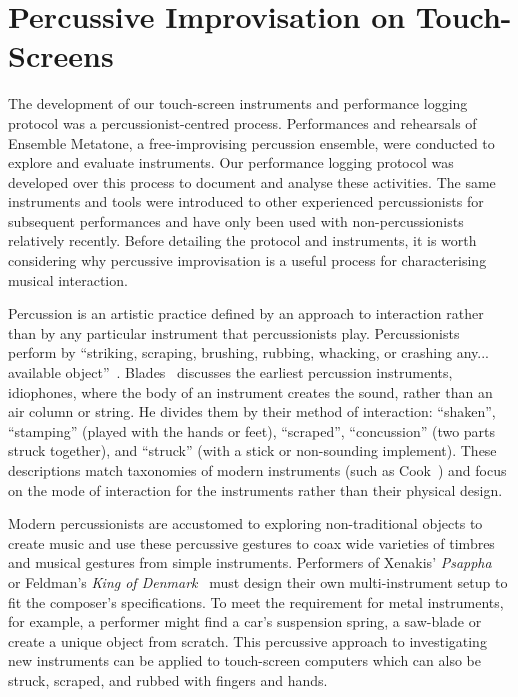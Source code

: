 \documentclass[graybox]{svmult}
\begin{document}
\section{Percussive Improvisation on Touch-Screens}
\label{sec:percussive-interaction}

The development of our touch-screen instruments and performance
logging protocol was a percussionist-centred process. Performances and
rehearsals of Ensemble Metatone, a free-improvising percussion
ensemble, were conducted to explore and evaluate instruments. Our
performance logging protocol was developed over this process to
document and analyse these activities. The same instruments and tools
were introduced to other experienced percussionists for subsequent
performances and have only been used with non-percussionists
relatively recently. Before detailing the protocol and instruments, it
is worth considering why percussive improvisation is a useful process
for characterising musical interaction.

Percussion is an artistic practice defined by an approach to
interaction rather than by any particular instrument that
percussionists play. Percussionists perform by ``striking, scraping,
brushing, rubbing, whacking, or crashing any... available
object''~\cite{Schick:2006fk}. Blades~\cite{Blades:1992kx} discusses
the earliest percussion instruments, idiophones, where the body of an
instrument creates the sound, rather than an air column or string. He
divides them by their method of interaction: ``shaken'', ``stamping''
(played with the hands or feet), ``scraped'', ``concussion'' (two
parts struck together), and ``struck'' (with a stick or non-sounding
implement). These descriptions match taxonomies of modern instruments
(such as Cook~\cite{Cook:1997vn}) and focus on the mode of interaction
for the instruments rather than their physical design.

Modern percussionists are accustomed to exploring non-traditional
objects to create music and use these percussive gestures to coax wide
varieties of timbres and musical gestures from simple instruments.
Performers of Xenakis' \emph{Psappha}~\cite{Xenakis:1975uq} or
Feldman's \emph{King of Denmark}~\cite{Feldman:1965uq} must design
their own multi-instrument setup to fit the composer's specifications.
To meet the requirement for metal instruments, for example, a
performer might find a car's suspension spring, a saw-blade or create
a unique object from scratch. This percussive approach to
investigating new instruments can be applied to touch-screen computers
which can also be struck, scraped, and rubbed with fingers and hands.
\end{document}
